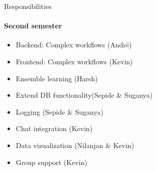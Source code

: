 \begin{frame}{Responsibilities}
\framesubtitle{Second semester}
	\begin{itemize}
		\item Backend: Complex workflows (André)
		\item Frontend: Complex workflows (Kevin)
		\item Ensemble learning  (Harsh)
		\item Extend DB functionality(Sepide \& Suganya)
		\item Logging (Sepide \& Suganya)
		\item Chat integration (Kevin)
		\item Data vizualization (Nilanjan \& Kevin)
		\item Group support (Kevin)
	\end{itemize}
\end{frame}